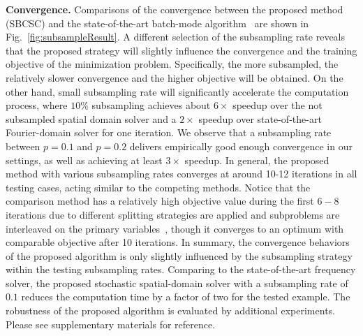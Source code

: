 {\bfseries Convergence.} Comparisons of the convergence between the
proposed method (SBCSC) and the state-of-the-art batch-mode
algorithm~\cite{heide2015fast} are shown in
Fig.~\ref{fig:subsampleResult}. A different selection of the
subsampling rate reveals that the proposed strategy will slightly
influence the convergence and the training objective of the
minimization problem. Specifically, the more subsampled, the
relatively slower convergence and the higher objective will be
obtained. On the other hand, small subsampling rate will significantly
accelerate the computation process, where $10\%$ subsampling achieves
about $6 \times$ speedup over the not subsampled spatial domain solver
and a $2 \times$ speedup over state-of-the-art Fourier-domain solver
for one iteration. We observe that a subsampling rate between $p=0.1$
and $p=0.2$ delivers empirically good enough convergence in our
settings, as well as achieving at least $3 \times$ speedup. In
general, the proposed method with various subsampling rates converges
at around 10-12 iterations in all testing cases, acting similar to the
competing methods.
Notice that the comparison method has a relatively
high objective value during the first $6-8$ iterations due to
different splitting strategies are applied and subproblems are
interleaved on the primary variables~\cite{wohlberg2016efficient},
though it converges to an optimum with comparable objective after 10
iterations. In summary, the convergence behaviors of the proposed
algorithm is only slightly influenced by the subsampling strategy
within the testing subsampling rates. Comparing to the
state-of-the-art frequency solver, the proposed stochastic
spatial-domain solver with a subsampling rate of $0.1$ reduces the
computation time by a factor of two for the tested example. The
robustness of the proposed algorithm is evaluated by additional
experiments. Please see supplementary materials for reference.

